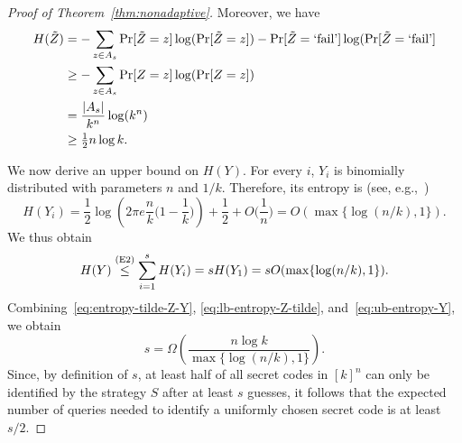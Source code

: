 \documentclass[english,a4paper,11pt]{article}
\newcommand{\ignore}[1]{}
\begin{document}
{\begin{proof}[Proof of Theorem~\ref{thm:nonadaptive}]
Moreover, we have
\begin{align}
H(\tilde Z)
& = -\sum_{z \in A_s} \Pr[ \tilde Z = z ] \log(\Pr[ \tilde Z = z]) - \Pr[ \tilde Z = \text{`fail'} ] \log(\Pr[ \tilde Z = \text{`fail'} ] \notag \\
& \ge - \sum_{z \in A_s} \Pr[ Z = z ] \log(\Pr[ Z = z]) \notag \\
& = \frac{|A_s|}{k^n} \log(k^n) \notag \\
& \ge \tfrac12 n \log k.
 \label{eq:lb-entropy-Z-tilde}
\end{align}

\ignore{
We derive a lower bound on $H(\tilde Z)$. Let $\mathbf{1}_{A_s}$ denote the indicator random variable for the event that $Z \in A_s$. Since $\mathbf{1}_{A_s}$ is determined completely by $\tilde Z$ we have by (E4) that
\begin{align} 
H(\tilde Z) & 
= H( \textbf{1}_{A_s}) + H( \tilde Z | \textbf{1}_{A_s}) \notag\\
& \ge H(\tilde Z | \textbf{1}_{A_s}) \notag \\
& \ge - \sum_{z \in [k]^n} \Pr[ \tilde Z = z \wedge Z \in A_s ] \log( \Pr[ \tilde Z = z | Z \in A_s ] ) \notag \\
& = - \sum_{z \in A_s} \frac1{k^n} \log \Big( \frac1{|A_s|} \Big) \notag \\
& = \frac{|A_s|}{k^n} \log (|A_s|) \notag\\
& \ge \frac{1}{2} \log \Big( \frac{1}{2} k^n \Big) = \Omega(n \log k). \label{eq:lb-entropy-Z-tilde}
\end{align}
}

We now derive an upper bound on $H(Y)$. For every $i$, $Y_i$ is binomially distributed with parameters $n$ and $1/k$. Therefore, its entropy is (see, e.g.,~\cite{jacquet1999entropy})
\begin{equation*}
H(Y_i) = \frac12 \log \left( 2\pi e \frac nk \Big(1 - \frac1k \Big) \right) + \frac12 + O \Big(\frac1n \Big) = O(\max\{\log(n/k), 1\}).
\end{equation*}
We thus obtain
\begin{equation} \label{eq:ub-entropy-Y}
H(Y) \stackrel{\textup{(E2)}}\le \sum_{i=1}^{s} H(Y_i) = s H(Y_1) = s O(\max\{\log(n/k),1\}).
\end{equation}
Combining~\eqref{eq:entropy-tilde-Z-Y}, \eqref{eq:lb-entropy-Z-tilde}, and~\eqref{eq:ub-entropy-Y}, we obtain
\[
s = \Omega \left( \frac{n \log k}{\max \{ \log(n/k), 1\} } \right).
\]
Since, by definition of $s$, at least half of all secret codes in $[k]^n$ can only be identified by the strategy $S$ after at least $s$ guesses, it follows that the expected number of queries needed to identify a uniformly chosen secret code is at least $s/2$.%
\end{proof}

}
\end{document}
